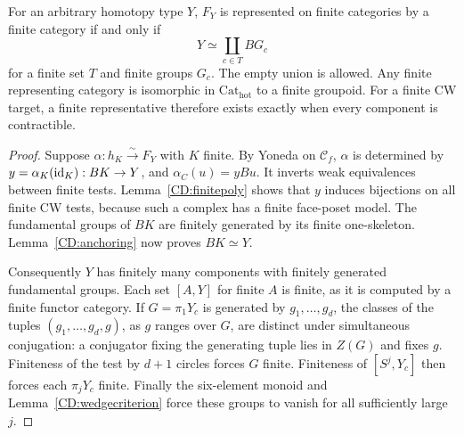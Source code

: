 \begin{theorem}
\label{CD:finiterepresentative}
For an arbitrary homotopy type $Y$, $F_Y$ is represented on finite
categories by a finite category if and only if
\[
                 Y\simeq\coprod_{c\in T}BG_c
\]
for a finite set $T$ and finite groups $G_c$.
The empty union is allowed.  Any finite representing category is
isomorphic in $\mathrm{Cat}_{\mathrm{hot}}$ to a finite groupoid.
For a finite CW target, a finite representative therefore exists
exactly when every component is contractible.
\end{theorem}
\begin{proof}
Suppose $\alpha:h_K\xrightarrow{\sim}F_Y$ with $K$ finite.
By Yoneda on $\mathcal C_f$, $\alpha$ is determined by
$y=\alpha_K(\mathrm{id}_K):BK\to Y$, and
$\alpha_C(u)=yBu$.  It inverts weak equivalences between finite tests.
Lemma~\ref{CD:finitepoly} shows that $y$ induces bijections on all finite
CW tests, because such a complex has a finite face-poset model.
The fundamental groups of $BK$ are finitely generated by its finite
one-skeleton.  Lemma~\ref{CD:anchoring} now proves $BK\simeq Y$.

Consequently $Y$ has finitely many components with finitely generated
fundamental groups.  Each set $[A,Y]$ for finite $A$ is finite, as it is
computed by a finite functor category.  If
$G=\pi_1Y_c$ is generated by $g_1,\ldots,g_d$, the classes of the tuples
$(g_1,\ldots,g_d,g)$, as $g$ ranges over $G$, are distinct under
simultaneous conjugation: a conjugator fixing the generating tuple
lies in $Z(G)$ and fixes $g$.  Finiteness of the test by $d+1$ circles
forces $G$ finite.  Finiteness of $[S^j,Y_c]$ then forces each
$\pi_jY_c$ finite.  Finally the six-element monoid and
Lemma~\ref{CD:wedgecriterion} force these groups to vanish for all
sufficiently large $j$.


\end{proof}
